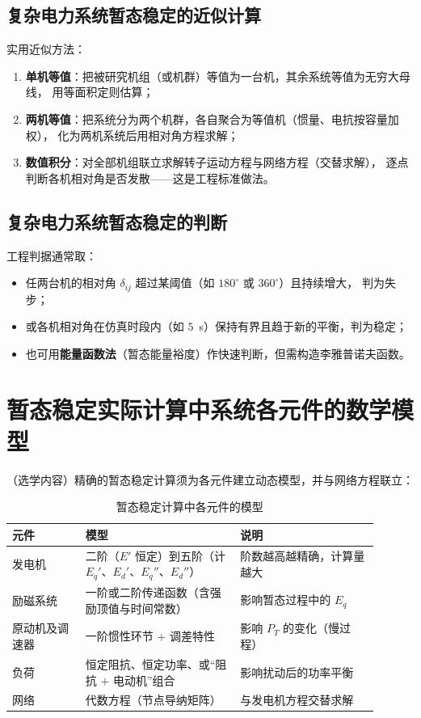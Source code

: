 \subsection{复杂电力系统暂态稳定的近似计算}

实用近似方法：
\begin{enumerate}
  \item \textbf{单机等值}：把被研究机组（或机群）等值为一台机，其余系统等值为无穷大母线，
        用等面积定则估算；
  \item \textbf{两机等值}：把系统分为两个机群，各自聚合为等值机（惯量、电抗按容量加权），
        化为两机系统后用相对角方程求解；
  \item \textbf{数值积分}：对全部机组联立求解转子运动方程与网络方程（交替求解），
        逐点判断各机相对角是否发散——这是工程标准做法。
\end{enumerate}

\subsection{复杂电力系统暂态稳定的判断}

工程判据通常取：
\begin{itemize}
  \item 任两台机的相对角 $\delta_{ij}$ 超过某阈值（如 $180^\circ$ 或 $360^\circ$）且持续增大，
        判为失步；
  \item 或各机相对角在仿真时段内（如 $5$~s）保持有界且趋于新的平衡，判为稳定；
  \item 也可用\textbf{能量函数法}（暂态能量裕度）作快速判断，但需构造李雅普诺夫函数。
\end{itemize}

\section{暂态稳定实际计算中系统各元件的数学模型}

（选学内容）精确的暂态稳定计算须为各元件建立动态模型，并与网络方程联立：

\begin{table}[htbp]
  \centering
  \caption{暂态稳定计算中各元件的模型}
  \small
  \begin{tabular}{@{}p{0.18\linewidth}p{0.38\linewidth}p{0.34\linewidth}@{}}
    \toprule
    元件 & 模型 & 说明 \\
    \midrule
    发电机 & 二阶（$E'$ 恒定）到五阶（计 $E_q'$、$E_d'$、$E_q''$、$E_d''$）
      & 阶数越高越精确，计算量越大 \\
    励磁系统 & 一阶或二阶传递函数（含强励顶值与时间常数） & 影响暂态过程中的 $E_q$ \\
    原动机及调速器 & 一阶惯性环节 $+$ 调差特性 & 影响 $P_T$ 的变化（慢过程） \\
    负荷 & 恒定阻抗、恒定功率、或“阻抗 $+$ 电动机”组合 & 影响扰动后的功率平衡 \\
    网络 & 代数方程（节点导纳矩阵） & 与发电机方程交替求解 \\
    \bottomrule
  \end{tabular}
\end{table}

